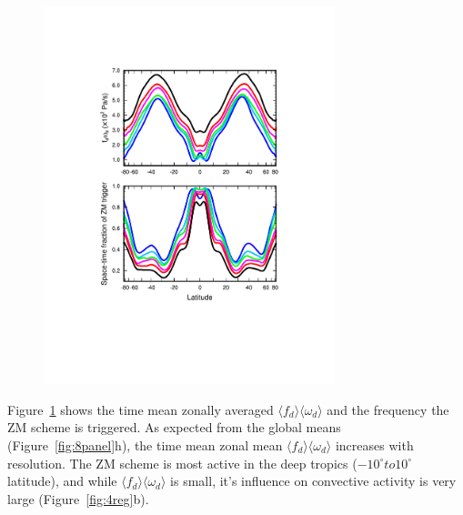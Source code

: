 \begin{figure}[t]
\begin{center}
\noindent\includegraphics[width=20pc,angle=0]{chapter6/temp_zonal_fracd*vomgd.pdf}\\
\end{center}
\caption{}
\label{fig:vomg}
\end{figure}

Figure~\ref{fig:vomg} shows the time mean zonally averaged $\langle f_{d} \rangle \langle \omega_{d} \rangle$ and the frequency the ZM scheme is triggered. As expected from the global means (Figure~\ref{fig:8panel}h), the time mean zonal mean $\langle f_{d} \rangle \langle \omega_{d} \rangle$ increases with resolution. The ZM scheme is most active in the deep tropics ($-10^{\circ} to 10^{\circ}$ latitude), and while $\langle f_{d} \rangle \langle \omega_{d} \rangle$ is small, it's influence on convective activity is very large (Figure~\ref{fig:4reg}b).


